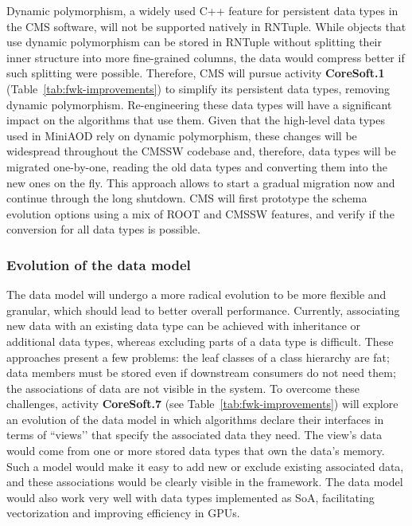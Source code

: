 Dynamic polymorphism, a widely used C++ feature for persistent data types in the CMS software, will not be supported natively in RNTuple. While objects that use dynamic polymorphism can be stored in RNTuple without splitting their inner structure into more fine-grained columns, the data would compress better if such splitting were possible. Therefore, CMS will pursue activity \textbf{CoreSoft.1} (Table~\ref{tab:fwk-improvements}) to simplify its persistent data types, removing dynamic polymorphism. Re-engineering these data types will have a significant impact on the algorithms that use them. Given that the high-level data types used in MiniAOD rely on dynamic polymorphism, these changes will be widespread throughout the \gls{CMSSW} codebase and, therefore,  data types will be migrated one-by-one, reading the old data types and converting them into the new ones on the fly. This approach allows to start a gradual migration now and continue through the long shutdown. CMS will first prototype the schema evolution options using a mix of \textsc{ROOT} and \gls{CMSSW} features, and verify if the conversion for all data types is possible.

\subsubsection{Evolution of the data model}

The data model will undergo a more radical evolution to be more flexible and granular, which should lead to better overall performance. Currently, associating new data with an existing data type can be achieved with inheritance or additional data types, whereas excluding parts of a data type is difficult. These approaches present a few problems: the leaf classes of a class hierarchy are fat; data members must be stored even if downstream consumers do not need them; the associations of data are not visible in the system. To overcome these challenges, activity \textbf{CoreSoft.7} (see Table~\ref{tab:fwk-improvements}) will explore an evolution of the data model in which algorithms declare their interfaces in terms of ``views’’ that specify the associated data they need. The view's data would come from one or more stored data types that own the data’s memory. Such a model would make it easy to add new or exclude existing associated data, and these associations would be clearly visible in the framework. The data model would also work very well with data types implemented as \gls{SoA}, facilitating vectorization and improving efficiency in \glspl{GPU}.

